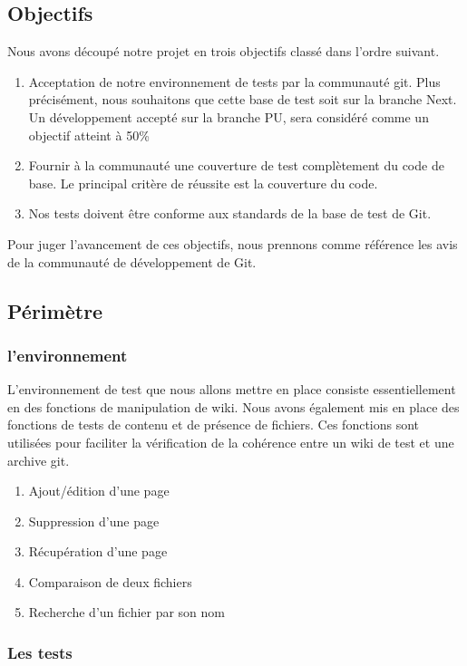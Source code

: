\documentclass[11pt]{article}
\begin{document}
\subsection{Objectifs}
Nous avons découpé notre projet en trois objectifs classé dans l'ordre suivant.
\begin{enumerate}
\item Acceptation de notre environnement de tests par la communauté git. Plus précisément, nous souhaitons que cette base de test soit sur la branche Next. Un développement accepté sur la branche PU, sera considéré comme un objectif atteint à 50\%
\item Fournir à la communauté une couverture de test complètement du code de base. Le principal critère de réussite est la couverture du code.
\item Nos tests doivent être conforme aux standards de la base de test de Git.
\end{enumerate}
Pour juger l'avancement de ces objectifs, nous prennons comme référence les avis de la communauté de développement de Git.\\
\subsection{Périmètre}
\subsubsection{l'environnement}
L'environnement de test que nous allons mettre en place consiste essentiellement en des fonctions de manipulation de wiki. Nous avons également mis en place des fonctions de tests de contenu et de présence de fichiers. Ces fonctions sont utilisées pour faciliter la vérification de la cohérence entre un wiki de test et une archive git.
\begin{enumerate}
\item Ajout/édition d'une page
\item Suppression d'une page
\item Récupération d'une page
\item Comparaison de deux fichiers
\item Recherche d'un fichier par son nom
\end{enumerate}
\subsubsection{Les tests}
\end{document}
